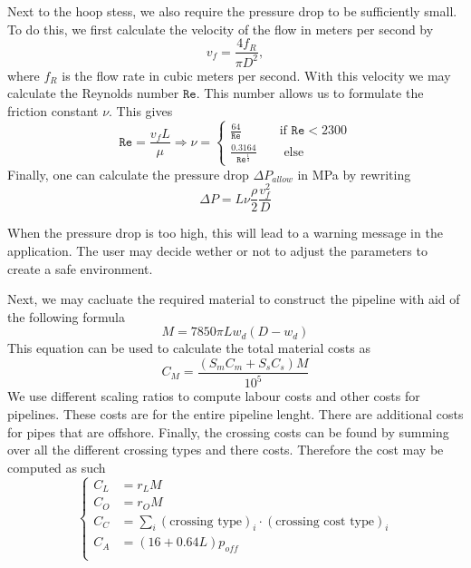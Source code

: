 \documentclass{article}
\begin{document}
Next to the hoop stess, we also require the pressure drop to be sufficiently small. To do this, we first calculate the velocity of the flow  in meters per second by
\begin{equation}
v_{f} = \frac{4f_R}{\pi D^2}, 
\end{equation}
where $f_R$ is the flow rate in cubic meters per second. With this velocity we may calculate the Reynolds number $\mathtt{Re}$. This number allows us to formulate the friction constant $\nu$. This gives 
\begin{equation}
\mathtt{Re} = \frac{v_fL}{\mu} \Rightarrow \nu = \begin{cases} \frac{64}{\mathtt{Re}} &\quad \text{if } \mathtt{Re} <2300\\
\frac{0.3164}{\mathtt{Re}^{\frac{1}{4}}}&\quad  \text{ else}
\end{cases} 
\end{equation}
Finally, one can calculate the pressure drop $\Delta P_{allow}$ in MPa by rewriting
\begin{equation}
\Delta P = L\nu \frac{\rho}{2}\frac{v_f^2}{D}
\end{equation}
\begin{info}
When the pressure drop is too high, this will lead to a warning message in the application. The user may decide wether or not to adjust the parameters to create a safe environment.
\end{info}
Next, we may cacluate the required material to construct the pipeline with aid of the following formula
\begin{equation}
M = 7850\pi Lw_d(D - w_d)
\end{equation}
This equation can be used to calculate the total material costs as
\begin{equation}
C_M = \frac{\left(S_mC_m +S_sC_s\right)M}{10^5}
\end{equation}
We use different scaling ratios to compute labour costs and other costs for pipelines. These costs are for the entire pipeline lenght. There are additional costs for pipes that are offshore. Finally, the crossing costs can be found by summing over all the different crossing types and there costs. Therefore the cost may be computed as such
\begin{equation}
\begin{cases}
C_L &= r_LM\\
C_O &= r_OM\\
C_C &= \sum_{i} (\text{crossing type})_i\cdot (\text{crossing cost type})_i\\
C_A &= (16 + 0.64L)p_{off}\\
\end{cases}
\end{equation}
\end{document}
